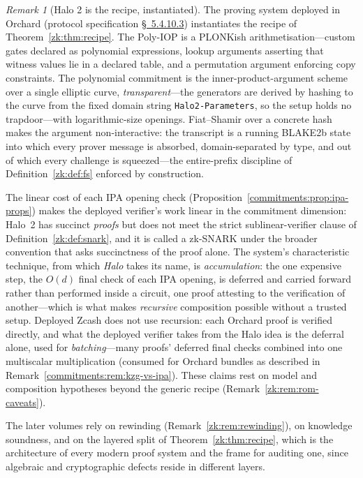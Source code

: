 \documentclass[11pt,a4paper]{article}
\theoremstyle{definition}
\theoremstyle{remark}
\newtheorem{remark}[theorem]{Remark}
\begin{document}
\begin{remark}[Halo 2 is the recipe, instantiated]
\label{zk:rem:halo2}
The proving system deployed in Orchard (protocol specification
\href{https://zips.z.cash/protocol/protocol.pdf\#halo2}{\S~5.4.10.3}) instantiates the recipe of Theorem~\ref{zk:thm:recipe}.
The Poly-IOP is a PLONKish arithmetisation---custom gates declared as
polynomial expressions, lookup arguments asserting that witness
values lie in a declared table, and a permutation argument enforcing
copy constraints. The polynomial commitment is the inner-product-argument
scheme over a single elliptic curve, \emph{transparent}---the
generators are derived by hashing to the curve from the fixed
domain string \texttt{Halo2-Parameters}, so the setup holds no
trapdoor---with logarithmic-size openings. Fiat--Shamir over a
concrete hash makes the argument non-interactive: the transcript is
a running BLAKE2b state into which every prover message is
absorbed, domain-separated by type, and out of which every
challenge is squeezed---the entire-prefix discipline of
Definition~\ref{zk:def:fs} enforced by construction.

The linear cost of each IPA opening check
(Proposition~\ref{commitments:prop:ipa-props}) makes the deployed
verifier's work linear in the commitment dimension: Halo~2 has
succinct \emph{proofs} but does not meet the strict
sublinear-verifier clause of Definition~\ref{zk:def:snark}, and it
is called a zk-SNARK under the broader convention that asks
succinctness of the proof alone. The system's characteristic
technique, from which \emph{Halo} takes its name, is
\emph{accumulation}: the one expensive step, the \(O(d)\) final
check of each IPA opening, is deferred and carried forward rather
than performed inside a circuit, one proof attesting to the
verification of another---which is what makes \emph{recursive}
composition possible without a trusted setup. Deployed Zcash does
not use recursion: each Orchard proof is verified directly, and
what the deployed verifier takes from the Halo idea is the deferral
alone, used for \emph{batching}---many proofs' deferred final
checks combined into one multiscalar multiplication
(consumed for Orchard bundles as described in
Remark~\ref{commitments:rem:kzg-vs-ipa}). These claims rest on model and
composition hypotheses beyond the generic recipe
(Remark~\ref{zk:rem:rom-caveats}).
\end{remark}

The later volumes rely on rewinding (Remark~\ref{zk:rem:rewinding}),
on knowledge soundness, and on the layered split of
Theorem~\ref{zk:thm:recipe}, which is the architecture of every modern
proof system and the frame for auditing one, since algebraic and
cryptographic defects reside in different layers.
\end{document}
